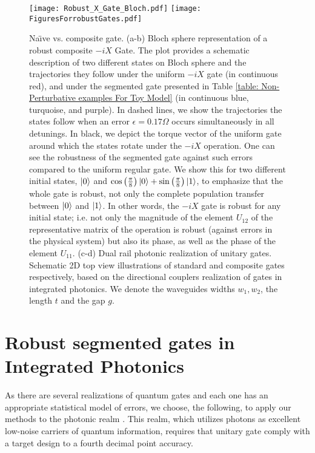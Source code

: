 \documentclass[floatfix,reprint, amsmath,amssymb,aps,superscriptaddress,nofootinbib]{revtex4-2}
\begin{document}
\begin{figure}[htbp]{}
        \texttt{[image: Robust\_X\_Gate\_Bloch.pdf]}
        \texttt{[image: FiguresForrobustGates.pdf]}
        \caption{Na\"{\i}ve vs. composite gate. (a-b) Bloch sphere representation of a robust composite $-iX$ Gate. The plot provides a schematic description of two different states on Bloch sphere and the trajectories they follow under the uniform $-iX$ gate (in continuous red), and under the segmented gate presented in Table \ref{table: Non-Perturbative examples For Toy Model} (in continuous blue, turquoise, and purple). In dashed lines, we show the trajectories the states follow when an error $\epsilon=0.17\Omega$  occurs simultaneously in all detunings. In black, we depict the torque vector of the uniform gate around which the states rotate under the $-iX$ operation.
        One can see the robustness of the segmented gate against such errors compared to the uniform regular gate. We show this for two different initial states, $\ket{0}$ and $\cos\left( \frac{\pi}{8} \right)\ket{0}+\sin\left( \frac{\pi}{8} \right)\ket{1}$, to emphasize that the whole gate is robust, not only the complete population transfer between $\ket{0}$ and $\ket{1}$. In other words, the $-iX$ gate is robust for any initial state; i.e. not only the magnitude of the element $U_{12}$ of the representative matrix of the operation is robust (against errors in the physical system) but also its phase, as well as the phase of the element $U_{11}$. (c-d) Dual rail photonic realization of unitary gates. Schematic 2D top view illustrations of standard and composite gates respectively, based on the directional couplers realization of gates in integrated photonics. We denote the waveguides widths $w_1,w_2$, the length $t$ and the gap $g$. }
         \label{fig: Bloch}
     \end{figure}


\section{Robust segmented gates in Integrated Photonics \label{sec: Photonics}}

As there are several realizations of quantum gates and each one has an appropriate statistical model of errors, we choose, the following, to apply our methods to the photonic realm \cite{OIDA:,Pelucchi2022,Moody_2022}.
This realm, which utilizes photons as excellent low-noise carriers of quantum information, requires that unitary gate  comply with a target design to a fourth decimal point accuracy\cite{Matthews2009}.
\end{document}
